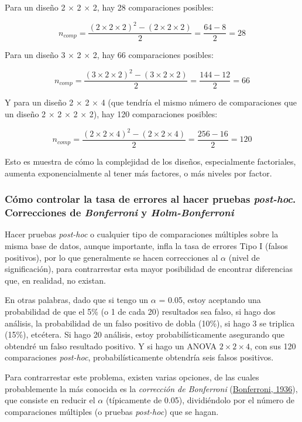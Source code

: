 \documentclass[
]{article}
\begin{document}
Para un diseño 2 \(\times\) 2 \(\times\) 2, hay 28 comparaciones
posibles:

\[n_{comp} = \frac{(2 \times 2 \times 2)^2-(2 \times 2 \times 2)}{2} = \frac{64-8}{2} = 28\]

Para un diseño 3 \(\times\) 2 \(\times\) 2, hay 66 comparaciones
posibles:

\[n_{comp} = \frac{(3 \times 2 \times 2)^2-(3 \times 2 \times 2)}{2} = \frac{144-12}{2} = 66\]

Y para un diseño 2 \(\times\) 2 \(\times\) 4 (que tendría el mismo
número de comparaciones que un diseño 2 \(\times\) 2 \(\times\) 2
\(\times\) 2), hay 120 comparaciones posibles:

\[n_{comp} = \frac{(2 \times 2 \times 4)^2-(2 \times 2 \times 4)}{2} = \frac{256-16}{2} = 120\]

Esto es muestra de cómo la complejidad de los diseños, especialmente
factoriales, aumenta exponencialmente al tener más factores, o más
niveles por factor.

\hypertarget{holm}{%
\subsubsection{\texorpdfstring{Cómo controlar la tasa de errores al
hacer pruebas \emph{post-hoc}. Correcciones de \emph{Bonferroni} y
\emph{Holm-Bonferroni}}{Cómo controlar la tasa de errores al hacer pruebas post-hoc. Correcciones de Bonferroni y Holm-Bonferroni}}\label{holm}}

Hacer pruebas \emph{post-hoc} o cualquier tipo de comparaciones
múltiples sobre la misma base de datos, aunque importante, infla la tasa
de errores Tipo I (falsos positivos), por lo que generalmente se hacen
correcciones al \(\alpha\) (nivel de significación), para contrarrestar
esta mayor posibilidad de encontrar diferencias que, en realidad, no
existan.

En otras palabras, dado que si tengo un \(\alpha\) = 0.05, estoy
aceptando una probabilidad de que el 5\% (o 1 de cada 20) resultados sea
falso, si hago dos análisis, la probabilidad de un falso positivo de
dobla (10\%), si hago 3 se triplica (15\%), etcétera. Si hago 20
análisis, estoy probabilísticamente asegurando que obtendré un falso
resultado positivo. Y si hago un ANOVA \(2 \times 2 \times 4\), con sus
120 comparaciones \emph{post-hoc}, probabilísticamente obtendría seis
falsos positivos.

Para contrarrestar este problema, existen varias opciones, de las cuales
probablemente la más conocida es la \emph{corrección de Bonferroni}
(\protect\hyperlink{ref-bonferroniTeoriaStatisticaClassi1936}{Bonferroni,
1936}), que consiste en reducir el \(\alpha\) (típicamente de 0.05),
dividiéndolo por el número de comparaciones múltiples (o pruebas
\emph{post-hoc}) que se hagan.
\end{document}
